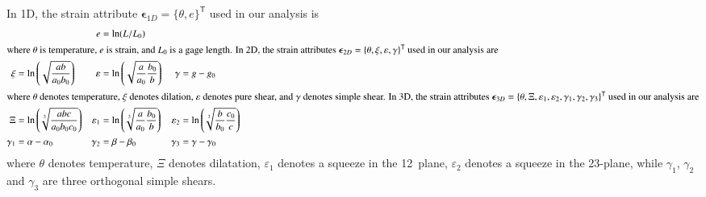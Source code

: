 In 1D, the strain attribute $\boldsymbol{\epsilon}_{1D}  = \{ \theta , e \}^{\mathsf{T}}$ used in our analysis is
\begin{subequations}
    \label{thermodynamicStrains}
    \begin{align}
    \mbox{} & & e & = \ln ( L / L_0 ) & & \\
    \intertext{where $\theta$ is temperature, $e$ is strain, and $L_0$ is a gage length.  In 2D, the strain attributes $\boldsymbol{\epsilon}_{2D}  = \{ \theta , \xi , \varepsilon , \gamma \}^{\mathsf{T}}$ used in our analysis are}
    \xi & = \ln \left( \sqrt{\frac{ab}{a_0 b_0}} \right) &
    \varepsilon & = \ln \left( \sqrt{ \frac{a}{a_0} \frac{b_0}{b} } \right) &
    \gamma & = g - g_0 \\
    \intertext{where $\theta$ denotes temperature, $\xi$ denotes dilation, $\varepsilon$ denotes pure shear, and $\gamma$ denotes simple shear.  In 3D, the strain attributes $\boldsymbol{\epsilon}_{3D} = \{ \theta , \Xi , \varepsilon_1 , \varepsilon_2 , \gamma_1 , \gamma_2 , \gamma_3  \}^{\mathsf{T}}$ used in our analysis are}
    \Xi & = \ln \left( \sqrt[3]{\frac{abc}{a_0 b_0 c_0}} \right) &
    \varepsilon_1 & = \ln \left( \sqrt[3]{\frac{a}{a_0} \frac{b_0}{b}} \right) &
    \varepsilon_2 & = \ln \left( \sqrt[3]{\frac{b}{b_0} \frac{c_0}{c}} \right) \notag \\
    \gamma_1 & = \alpha - \alpha_0 &
    \gamma_2 & = \beta - \beta_0 &
    \gamma_3 & = \gamma - \gamma_0
    \end{align}
\end{subequations}
where $\theta$ denotes temperature, $\Xi$ denotes dilatation, $\varepsilon_1$ denotes a squeeze in the 12~plane, $\varepsilon_2$ denotes a squeeze in the 23-plane, while $\gamma_1$, $\gamma_2$ and $\gamma_3$ are three orthogonal simple shears.  

